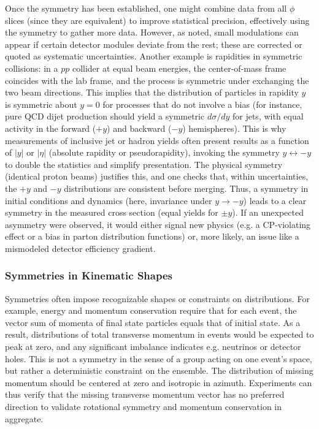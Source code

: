             Once the symmetry has been established, one might combine data from all $\phi$ slices (since they are equivalent) to improve statistical precision, effectively using the symmetry to gather more data.
            However, as noted, small modulations can appear if certain detector modules deviate from the rest; these are corrected or quoted as systematic uncertainties.
            Another example is rapidities in symmetric collisions: in a $pp$ collider at equal beam energies, the center-of-mass frame coincides with the lab frame, and the process is symmetric under exchanging the two beam directions.
            This implies that the distribution of particles in rapidity $y$ is symmetric about $y=0$ for processes that do not involve a bias (for instance, pure QCD dijet production should yield a symmetric $d\sigma/dy$ for jets, with equal activity in the forward ($+y$) and backward ($-y$) hemispheres).
            This is why measurements of inclusive jet or hadron yields often present results as a function of $|y|$ or $|\eta|$ (absolute rapidity or pseudorapidity), invoking the symmetry $y \leftrightarrow -y$ to double the statistics and simplify presentation.
            The physical symmetry (identical proton beams) justifies this, and one checks that, within uncertainties, the $+y$ and $-y$ distributions are consistent before merging.
            Thus, a symmetry in initial conditions and dynamics (here, invariance under $y\to -y$) leads to a clear symmetry in the measured cross section (equal yields for $\pm y$).
            If an unexpected asymmetry were observed, it would either signal new physics (e.g. a CP-violating effect or a bias in parton distribution functions) or, more likely, an issue like a mismodeled detector efficiency gradient.

        \subsubsection{Symmetries in Kinematic Shapes}
            Symmetries often impose recognizable shapes or constraints on distributions.
            For example, energy and momentum conservation require that for each event, the vector sum of momenta of final state particles equals that of initial state.
            As a result, distributions of total transverse momentum in events would be expected to peak at zero, and any significant imbalance indicates e.g. neutrinos or detector holes.
            This is not a symmetry in the sense of a group acting on one event's space, but rather a deterministic constraint on the ensemble.
            The distribution of missing momentum should be centered at zero and isotropic in azimuth.
            Experiments can thus verify that the missing transverse momentum vector has no preferred direction to validate rotational symmetry and momentum conservation in aggregate.
            
